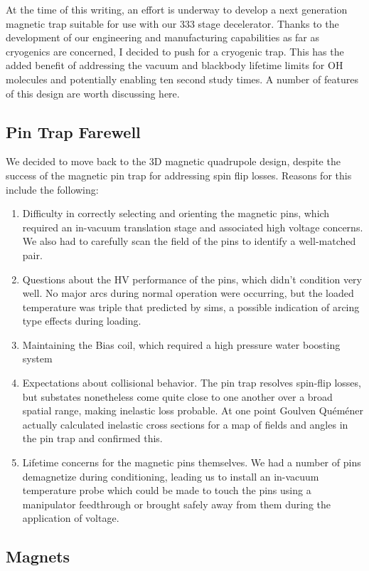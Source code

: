 At the time of this writing, an effort is underway to develop a next generation magnetic trap suitable for use with our $333$ stage decelerator.
Thanks to the development of our engineering and manufacturing capabilities as far as cryogenics are concerned, I decided to push for a cryogenic trap.
This has the added benefit of addressing the vacuum and blackbody lifetime limits for OH molecules and potentially enabling ten second study times.
A number of features of this design are worth discussing here.

\subsection{Pin Trap Farewell}

We decided to move back to the 3D magnetic quadrupole design, despite the success of the magnetic pin trap for addressing spin flip losses.
Reasons for this include the following:
\begin{enumerate}
\item Difficulty in correctly selecting and orienting the magnetic pins, which required an in-vacuum translation stage and associated high voltage concerns. We also had to carefully scan the field of the pins to identify a well-matched pair.
\item Questions about the HV performance of the pins, which didn't condition very well. 
No major arcs during normal operation were occurring, but the loaded temperature was triple that predicted by sims, a possible indication of arcing type effects during loading.
\item Maintaining the Bias coil, which required a high pressure water boosting system~\cite{Reens2017booster}
\item Expectations about collisional behavior. The pin trap resolves spin-flip losses, but substates nonetheless come quite close to one another over a broad spatial range, making inelastic loss probable. At one point Goulven Qu\'em\'ener actually calculated inelastic cross sections for a map of fields and angles in the pin trap and confirmed this.
\item Lifetime concerns for the magnetic pins themselves. We had a number of pins demagnetize during conditioning, leading us to install an in-vacuum temperature probe which could be made to touch the pins using a manipulator feedthrough or brought safely away from them during the application of voltage.
\end{enumerate}

\subsection{Magnets}

